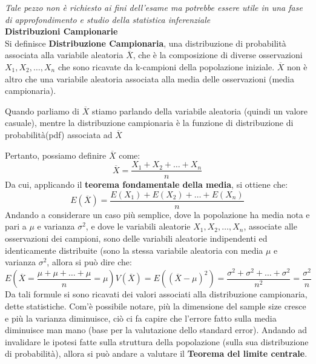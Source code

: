 \begin{info}\label{inf:distribuzioni-Campionarie}
\textit{Tale pezzo non è richiesto ai fini dell'esame ma potrebbe essere utile in una fase di approfondimento e studio della statistica inferenziale}
    \\
\textbf{Distribuzioni Campionarie}\\
Si definisce \textbf{Distribuzione Campionaria}, una distribuzione di probabilità associata alla variabile aleatoria \(\overline{X}\), che è la composizione di diverse osservazioni \(X_1, X_2, \dots, X_n\) che sono ricavate da k-campioni della popolazione iniziale. \(\overline{X}\) non è altro che una variabile aleatoria associata alla media delle osservazioni (media campionaria).
\begin{warn}
Quando parliamo di \(\overline{X}\) stiamo parlando della variabile aleatoria (quindi un valore casuale), mentre la distribuzione campionaria è la funzione di distribuzione di probabilità(pdf) associata ad \(\overline{X}\)
\end{warn}

Pertanto, possiamo definire \(\overline{X}\) come:
\[
\overline{X} = \frac{X_1 + X_2 + \dots + X_n}{n}
\]
Da cui, applicando il \textbf{teorema fondamentale della media}, si ottiene che:
\[
E(\overline{X}) = \frac{E(X_1) + E(X_2) + \dots + E(X_n)}{n}
\]
Andando a considerare un caso più semplice, dove la popolazione ha media nota e pari a \(\mu\) e varianza \(\sigma^2\), e dove le variabili aleatorie \(X_1, X_2, \dots, X_n\), associate alle osservazioni dei campioni, sono delle variabili aleatorie indipendenti ed identicamente distribuite (sono la stessa variabile aleatoria con media \(\mu\) e varianza \(\sigma^2\), allora si può dire che:
\[
E(\overline{X} = \frac{\mu + \mu + \dots + \mu}{n} = \mu)
V(\overline{X}) = E((\overline{X} - \mu)^2) = \frac{\sigma^2 + \sigma^2 + \dots + \sigma^2}{n^2} = \frac{\sigma^2}{n} 
\]
Da tali formule si sono ricavati dei valori associati alla distribuzione campionaria, dette statistiche. Com'è possibile notare, più la dimensione del sample size cresce e più la varianza diminuisce, ciò ci fa capire che l'errore fatto sulla media diminuisce man mano (base per la valutazione dello standard error).
Andando ad invalidare le ipotesi fatte sulla struttura della popolazione (sulla sua distribuzione di probabilità), allora si può andare a valutare il \textbf{Teorema del limite centrale}.
\end{info}


